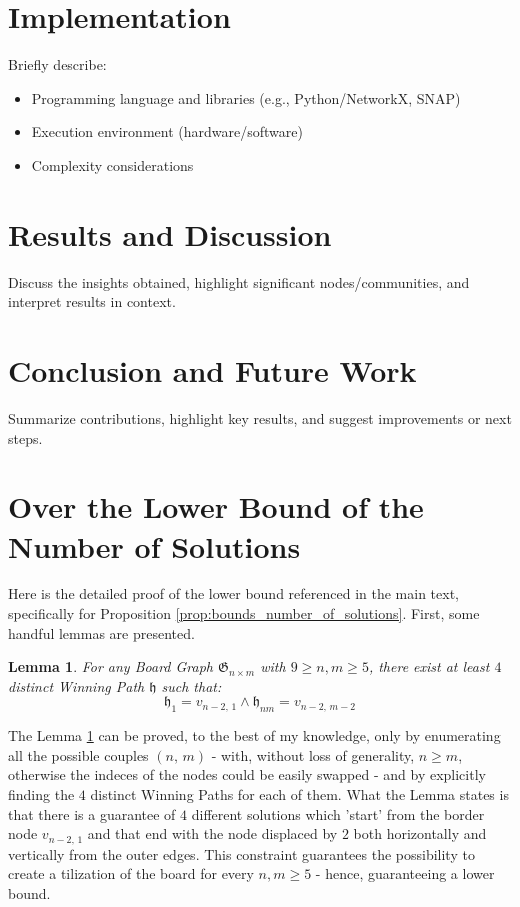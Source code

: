 \documentclass[conference]{IEEEtran}
\newtheorem{lemma}{Lemma}[section]
\begin{document}
\section{Implementation}
Briefly describe:
\begin{itemize}
    \item Programming language and libraries (e.g., Python/NetworkX, SNAP)
    \item Execution environment (hardware/software)
    \item Complexity considerations
\end{itemize}

\section{Results and Discussion}

Discuss the insights obtained, highlight significant nodes/communities, 
and interpret results in context.

\section{Conclusion and Future Work}
Summarize contributions, highlight key results, and suggest improvements or next steps.


\newpage


\newpage
\appendices
\section{Over the Lower Bound of the Number of Solutions}\label{appendix:proof_lower_bound}
Here is the detailed proof of the lower bound referenced in the main text, specifically for Proposition \ref{prop:bounds_number_of_solutions}.
First, some handful lemmas are presented.

\begin{lemma} \label{lem:four_boards}
    For any Board Graph $\mathfrak{G}_{n \times m}$ with $9 \ge n, m \ge 5$, there exist at least $4$ distinct Winning Path $\mathfrak{h}$ such that:
    $$
        \mathfrak{h}_1 = v_{n-2,\,1} \land \mathfrak{h}_{nm} = v_{n-2,\,m-2} 
    $$
\end{lemma}

The Lemma \ref{lem:four_boards} can be proved, to the best of my knowledge, only by enumerating all the possible couples $(n,\,m)$ - with, without loss of generality, $n \ge m$, otherwise the indeces of the nodes could be easily swapped - 
and by explicitly finding the $4$ distinct Winning Paths for each of them.
What the Lemma states is that there is a guarantee of $4$ different solutions which 'start' from the border node $v_{n-2,\,1}$ and that end with the node displaced by $2$ both horizontally and vertically from the outer edges.
This constraint guarantees the possibility to create a tilization of the board for every $n, m \ge 5$ - hence, guaranteeing a lower bound.
\end{document}
